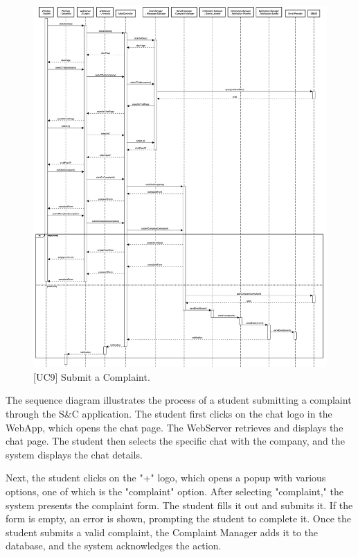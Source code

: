 \begin{figure}[htbp]
    \centering
    \includegraphics[width=\linewidth]{DD/Images/sequenceDiagrams/sumbitComplaint.png}
    \caption{[UC9] Submit a Complaint.}
    \label{fig:submitComplaint_immagine}
\end{figure}
\clearpage

The sequence diagram illustrates the process of a student submitting a complaint through the S\&C application. The student first clicks on the chat logo in the WebApp, which opens the chat page. The WebServer retrieves and displays the chat page. The student then selects the specific chat with the company, and the system displays the chat details.

Next, the student clicks on the "+" logo, which opens a popup with various options, one of which is the "complaint" option. After selecting "complaint," the system presents the complaint form. The student fills it out and submits it. If the form is empty, an error is shown, prompting the student to complete it. Once the student submits a valid complaint, the Complaint Manager adds it to the database, and the system acknowledges the action.

